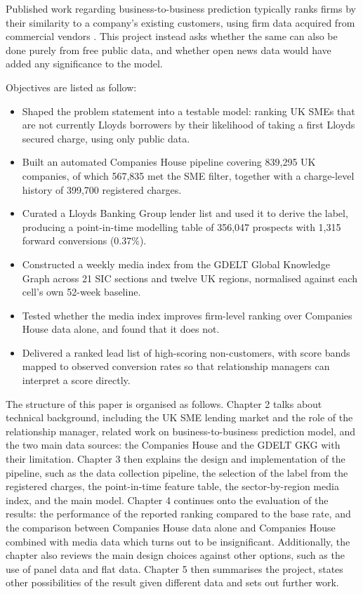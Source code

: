 \documentclass[ %
                    author={Natchalin Iwsakul \\ Inkaphol Siriwongwattana \\ Tanaphan Kummaraphat \\ Patorn Srisupap},
                supervisor={Fernando Moreno-Pino},
                    degree={MSc},
                     title={Propensity Modelling for SME Commercial Lending Using Open Public Data},
                  subtitle={Companies House filings and GDELT media coverage as predictors of first-time borrowing},
                      type={},
                      year={2026}]{dissertation}
\begin{document}
Published work regarding business-to-business prediction typically ranks firms by their similarity to a company's existing customers, using firm data acquired from commercial vendors \cite{dhaen_model}. This project instead asks whether the same can also be done purely from free public data, and whether open news data would have added any significance to the model.

Objectives are listed as follow:
\begin{itemize}
  \item Shaped the problem statement into a testable model: ranking
        UK SMEs that are not currently Lloyds borrowers by their likelihood of
        taking a first Lloyds secured charge, using only
        public data.
  \item Built an automated Companies House pipeline covering 839,295 UK
        companies, of which 567,835 met the SME filter, together with a
        charge-level history of 399,700 registered charges.
  \item Curated a Lloyds Banking Group lender list and used it to derive the
        label, producing a point-in-time modelling table of 356,047 prospects
        with 1,315 forward conversions (0.37\%).
  \item Constructed a weekly media index from the GDELT Global Knowledge Graph
        across 21 SIC sections and twelve UK regions, normalised against each
        cell's own 52-week baseline.
  \item Tested whether the media index improves firm-level ranking over
        Companies House data alone, and found that it does not.
  \item Delivered a ranked lead list of high-scoring non-customers, with score
        bands mapped to observed conversion rates so that relationship
        managers can interpret a score directly.
\end{itemize}

The structure of this paper is organised as follows. Chapter 2 talks about technical background, including the UK SME lending market and the role of the relationship manager, related work on business-to-business prediction model, and the two main data sources: the Companies House and the GDELT GKG with their limitation. Chapter 3 then explains the design and implementation of the pipeline, such as the data collection pipeline, the selection of the label from the registered charges, the point-in-time feature table, the sector-by-region media index, and the main model. Chapter 4 continues onto the evaluation of the results: the performance of the reported ranking compared to the base rate, and the comparison between Companies House data alone and Companies House combined with media data which turns out to be insignificant. Additionally, the chapter also reviews the main design choices against other options, such as the use of panel data and flat data. Chapter 5 then summarises the project, states other possibilities of the result given different data and sets out further work.
\end{document}
